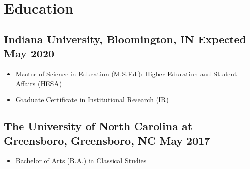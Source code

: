 \documentclass{article}
\begin{document}
\renewcommand{\headrulewidth}{0pt}


\hspace{0.10in}
\section*{Education\hrulefill} 

\subsection*{Indiana University, Bloomington, IN \hfill \textnormal{ Expected May 2020}}
\begin{itemize}
\item Master of Science in Education (M.S.Ed.): Higher Education and  Student Affairs (HESA)
\item Graduate Certificate in Institutional Research (IR)
\end{itemize}

\subsection*{The University of North Carolina at Greensboro, Greensboro, NC
  \hfill \textnormal{ May 2017}}
\begin{itemize}
\item Bachelor of Arts (B.A.) in Classical Studies
\end{itemize}
\end{document}
